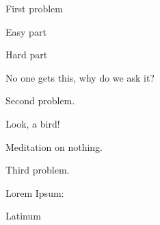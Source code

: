 \documentclass{nmd/exam}
\begin{document}
  \begin{problems}
    \item First problem
      \begin{subproblems}
      \item Easy part 

        \vspace{2cm}

        \hfill {}

      \item Hard part 

        \vspace{4cm}

        \hfill {}


      \item No one gets this, why do we ask it? 
        
        \vspace{1cm}
        
        \hfill \posnegzero
      \end{subproblems}

    \item Second problem.
      \begin{subproblems}
      \item Look, a bird!

        \vspace{1cm}

        \hfill \ansplane
        
      \item Meditation on nothing. 

        \vfill 

        \hfill \ansbox{\anspt}
      \end{subproblems}

      \pagebk


    \item Third problem.
      \begin{subproblems}
      \item Lorem Ipsum: \quad \truefalse

      \item Latinum 
        
        \vspace{4cm}

        \hfill {}


\end{subproblems}
\end{problems}
\end{document}
